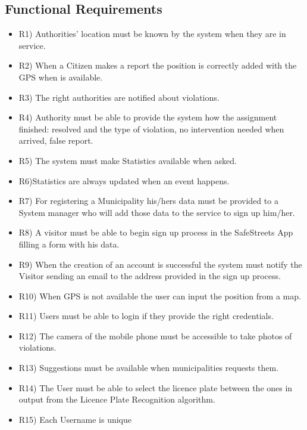 \subsection{Functional Requirements}
\begin{itemize}

 \item R1) Authorities’ location must be known by the system when they are in service.
\item  R2) When a Citizen makes a report the position is correctly added with the GPS when is available.
\item R3) The right authorities are notified about violations.
 \item R4)  Authority must be able to provide the system how the assignment finished: resolved and the type of violation, no intervention needed when arrived, false report.
 \item R5) The system must make Statistics available when asked.
 \item R6)Statistics are always updated when an event happens.  
\item R7) For registering a Municipality his/hers data must be provided to a System manager who will add those data to the service to sign up him/her.
 \item R8) A visitor must be able to begin sign up process in the SafeStreets App filling a form with his data.
 \item R9) When the creation of an account is successful the system must notify the Visitor sending an email to the address provided in the sign up process. 
 \item R10) When GPS is not available the user can input the position from a map.
 \item R11) Users must be able to login if they provide the right credentials.
\item R12) The camera of the mobile phone must be accessible to take photos of violations.
\item R13) Suggestions must be available when municipalities requests them.
\item R14) The User must be able to select the licence plate between the ones in output from the Licence Plate Recognition algorithm.
\item R15) Each Username is unique
\end{itemize}
